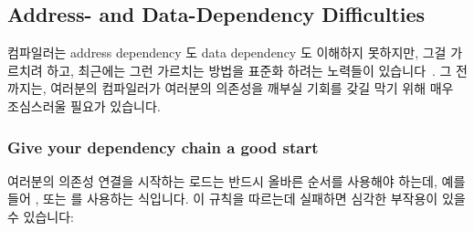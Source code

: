 \subsection{Address- and Data-Dependency Difficulties}
\label{sec:memorder:Address- and Data-Dependency Difficulties}

컴파일러는 address dependency 도 data dependency 도 이해하지 못하지만, 그걸
가르치려 하고, 최근에는 그런 가르치는 방법을 표준화 하려는 노력들이
있습니다~\cite{PaulEMcKennneyConsumeP0190R4,PaulEMcKenney2017markconsumeP0462R1}.
그 전까지는, 여러분의 컴파일러가 여러분의 의존성을 깨부실 기회를 갖길 막기 위해
매우 조심스러울 필요가 있습니다.

\subsubsection{Give your dependency chain a good start}

여러분의 의존성 연결을 시작하는 로드는 반드시 올바른 순서를 사용해야 하는데,
예를 들어 , 또는  를 사용하는 식입니다.
이 규칙을 따르는데 실패하면 심각한 부작용이 있을 수 있습니다:

